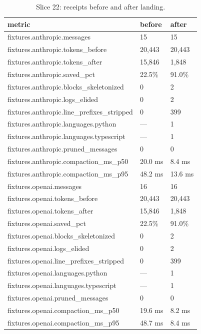 \documentclass{article}
\begin{document}
\begin{table}[h]
\centering
\begin{tabular}{lll}
\toprule
metric & before & after \\
\midrule
fixtures.anthropic.messages & 15 & 15 \\
fixtures.anthropic.tokens\_before & 20,443 & 20,443 \\
fixtures.anthropic.tokens\_after & 15,846 & 1,848 \\
fixtures.anthropic.saved\_pct & 22.5\% & 91.0\% \\
fixtures.anthropic.blocks\_skeletonized & 0 & 2 \\
fixtures.anthropic.logs\_elided & 0 & 2 \\
fixtures.anthropic.line\_prefixes\_stripped & 0 & 399 \\
fixtures.anthropic.languages.python & — & 1 \\
fixtures.anthropic.languages.typescript & — & 1 \\
fixtures.anthropic.pruned\_messages & 0 & 0 \\
fixtures.anthropic.compaction\_ms\_p50 & 20.0 ms & 8.4 ms \\
fixtures.anthropic.compaction\_ms\_p95 & 48.2 ms & 13.6 ms \\
fixtures.openai.messages & 16 & 16 \\
fixtures.openai.tokens\_before & 20,443 & 20,443 \\
fixtures.openai.tokens\_after & 15,846 & 1,848 \\
fixtures.openai.saved\_pct & 22.5\% & 91.0\% \\
fixtures.openai.blocks\_skeletonized & 0 & 2 \\
fixtures.openai.logs\_elided & 0 & 2 \\
fixtures.openai.line\_prefixes\_stripped & 0 & 399 \\
fixtures.openai.languages.python & — & 1 \\
fixtures.openai.languages.typescript & — & 1 \\
fixtures.openai.pruned\_messages & 0 & 0 \\
fixtures.openai.compaction\_ms\_p50 & 19.6 ms & 8.2 ms \\
fixtures.openai.compaction\_ms\_p95 & 48.7 ms & 8.4 ms \\
\bottomrule
\end{tabular}
\caption{Slice 22: receipts before and after landing.}
\label{tab:slice22}
\end{table}
\end{document}
